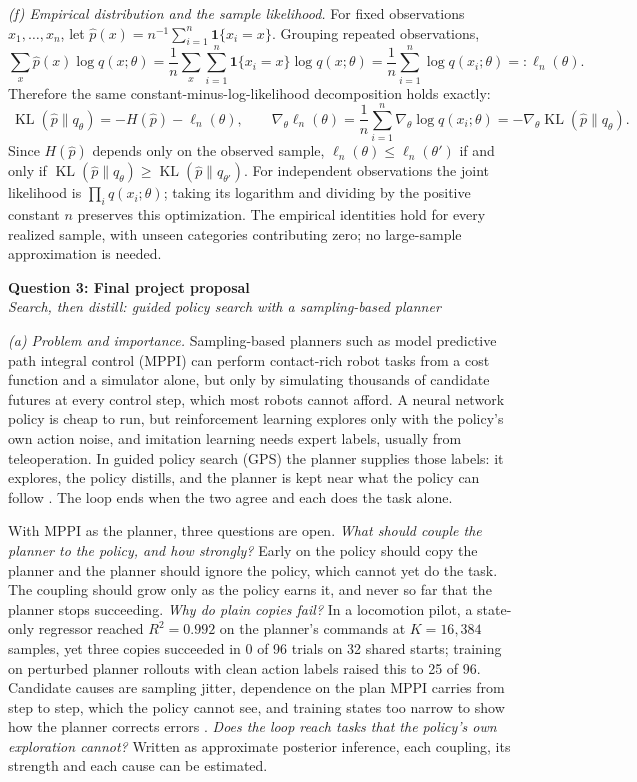\documentclass[12pt]{article}
\newcommand{\KL}{\operatorname{KL}}
\begin{document}
\textit{(f) Empirical distribution and the sample likelihood.}
For fixed observations $x_1,\ldots,x_n$, let
$\widehat p(x)=n^{-1}\sum_{i=1}^n\mathbf1\{x_i=x\}$. Grouping repeated observations,
\[
\sum_x\widehat p(x)\log q(x;\theta)
=\frac1n\sum_x\sum_{i=1}^n\mathbf1\{x_i=x\}\log q(x;\theta)
=\frac1n\sum_{i=1}^n\log q(x_i;\theta)=:\ell_n(\theta).
\]
Therefore the same constant-minus-log-likelihood decomposition holds exactly:
\[
\boxed{\ \KL(\widehat p\|q_\theta)=-H(\widehat p)-\ell_n(\theta),\qquad
\nabla_\theta\ell_n(\theta)=\frac1n\sum_{i=1}^n\nabla_\theta\log q(x_i;\theta)
=-\nabla_\theta\KL(\widehat p\|q_\theta).\ }
\]
Since $H(\widehat p)$ depends only on the observed sample,
$\ell_n(\theta)\le\ell_n(\theta')$ if and only if
$\KL(\widehat p\|q_\theta)\ge\KL(\widehat p\|q_{\theta'})$.
For independent observations the joint likelihood is $\prod_iq(x_i;\theta)$;
taking its logarithm and dividing by the positive constant $n$ preserves this
optimization. The empirical identities hold for every realized sample, with
unseen categories contributing zero; no large-sample approximation is needed.

\clearpage
\textbf{Question 3: Final project proposal}\\
\textit{Search, then distill: guided policy search with a sampling-based planner}

\textit{(a) Problem and importance.}
Sampling-based planners such as model predictive path integral control (MPPI)
\citep{williams2017} can perform contact-rich robot tasks from a cost function and a
simulator alone, but only by simulating thousands of candidate futures at every
control step, which most robots cannot afford. A neural network policy is cheap to
run, but reinforcement learning explores only with the policy's own action noise,
and imitation learning needs expert labels, usually from teleoperation. In guided policy search (GPS) the planner supplies those labels: it
explores, the policy distills, and the planner is kept near what the policy can
follow \citep{levine2013,mordatch2015}. The loop ends when the two agree and each
does the task alone.

With MPPI as the planner, three questions are open. \emph{What should couple the
planner to the policy, and how strongly?} Early on the policy should copy the planner
and the planner should ignore the policy, which cannot yet do the task. The coupling
should grow only as the policy earns it, and never so far that the planner stops
succeeding. \emph{Why do plain copies fail?} In a locomotion pilot, a state-only
regressor reached $R^2=0.992$ on the planner's commands at $K=16{,}384$ samples, yet
three copies succeeded in 0 of 96 trials on 32 shared starts; training on perturbed
planner rollouts with clean action labels \citep{laskey2017} raised this to 25 of 96.
Candidate causes are sampling jitter, dependence on the plan MPPI carries from step
to step, which the policy cannot see, and training states too narrow to show how the
planner corrects errors \citep{ross2011}. \emph{Does the loop reach tasks that the
policy's own exploration cannot?} Written as approximate posterior inference, each
coupling, its strength and each cause can be estimated.
\end{document}
